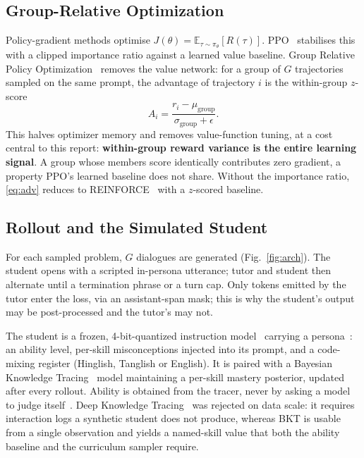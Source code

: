 \documentclass[conference]{IEEEtran}
\begin{document}
\subsection{Group-Relative Optimization}

Policy-gradient methods optimise
$J(\theta)=\mathbb{E}_{\tau\sim\pi_\theta}[R(\tau)]$. PPO~\cite{ppo}
stabilises this with a clipped importance ratio against a learned value
baseline. Group Relative Policy Optimization~\cite{grpo} removes the value
network: for a group of $G$ trajectories sampled on the same prompt, the
advantage of trajectory $i$ is the within-group $z$-score
\begin{equation}
A_i=\frac{r_i-\mu_{\text{group}}}{\sigma_{\text{group}}+\epsilon}.
\label{eq:adv}
\end{equation}
This halves optimizer memory and removes value-function tuning, at a cost
central to this report: \textbf{within-group reward variance is the entire
learning signal}. A group whose members score identically contributes zero
gradient, a property PPO's learned baseline does not share. Without the
importance ratio, \eqref{eq:adv} reduces to REINFORCE~\cite{reinforce} with
a $z$-scored baseline.

\subsection{Rollout and the Simulated Student}

For each sampled problem, $G$ dialogues are generated (Fig.~\ref{fig:arch}).
The student opens with a scripted in-persona utterance; tutor and student
then alternate until a termination phrase or a turn cap. Only tokens
emitted by the tutor enter the loss, via an assistant-span mask; this is
why the student's output may be post-processed and the tutor's may not.

The student is a frozen, 4-bit-quantized instruction model~\cite{qwen}
carrying a persona~\cite{rev-simstudents}: an ability level, per-skill
misconceptions injected into its prompt, and a code-mixing register
(Hinglish, Tanglish or English). It is paired with a Bayesian Knowledge
Tracing~\cite{bkt} model maintaining a per-skill mastery posterior, updated
after every rollout. Ability is obtained from the tracer, never by asking a
model to judge itself~\cite{rev-learnermodel}. Deep Knowledge
Tracing~\cite{dkt} was rejected on data scale: it requires interaction logs
a synthetic student does not produce, whereas BKT is usable from a single
observation and yields a named-skill value that both the ability baseline
and the curriculum sampler require.
\end{document}
